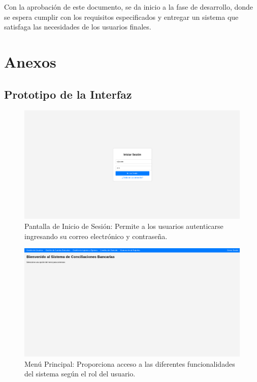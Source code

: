 \documentclass{article}
\begin{document}
Con la aprobación de este documento, se da inicio a la fase de desarrollo, donde se espera cumplir con los requisitos especificados y entregar un sistema que satisfaga las necesidades de los usuarios finales.

\newpage
\section{Anexos}

\subsection{Prototipo de la Interfaz}

\begin{figure}[H]
    \centering
    \includegraphics[width=\textwidth]{img/image1.png}
    \caption{Pantalla de Inicio de Sesión: Permite a los usuarios autenticarse ingresando su correo electrónico y contraseña.}
\end{figure}

\begin{figure}[H]
    \centering
    \includegraphics[width=\textwidth]{img/image2.png}
    \caption{Menú Principal: Proporciona acceso a las diferentes funcionalidades del sistema según el rol del usuario.}
\end{figure}
\end{document}
